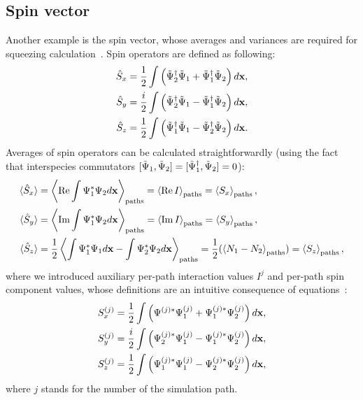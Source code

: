 \subsection{Spin vector}

Another example is the spin vector, whose averages and variances are required for squeezing calculation~\cite{Li2009}.
Spin operators are defined as following:
\begin{equation}
\label{eqn:moments-calculation:spin-operators}
\begin{split}
	\hat{S}_x & = \frac{1}{2} \int \left(
		\tilde{\Psi}^\dagger_2 \tilde{\Psi}_1 + \tilde{\Psi}^\dagger_1 \tilde{\Psi}_2
	\right) d\mathbf{x}, \\
	\hat{S}_y & = \frac{i}{2} \int \left(
		\tilde{\Psi}^\dagger_2 \tilde{\Psi}_1 - \tilde{\Psi}^\dagger_1 \tilde{\Psi}_2
	\right) d\mathbf{x}, \\
	\hat{S}_z & = \frac{1}{2} \int \left(
		\tilde{\Psi}^\dagger_1 \tilde{\Psi}_1 - \tilde{\Psi}^\dagger_2 \tilde{\Psi}_2
	\right) d\mathbf{x}.
\end{split}
\end{equation}
Averages of spin operators can be calculated straightforwardly (using the fact that interspecies commutators $[\tilde{\Psi}_1, \tilde{\Psi}_2] = [\tilde{\Psi}^\dagger_1, \tilde{\Psi}_2] = 0$):
\begin{equation*}
\begin{split}
	\langle \hat{S}_x \rangle
		& = \left\langle \operatorname{Re} \int \Psi^*_1 \Psi_2 d\mathbf{x}  \right\rangle_{\mathrm{paths}}
		= \left\langle \operatorname{Re} I \right\rangle_{\mathrm{paths}}
		= \left\langle S_x \right\rangle_{\mathrm{paths}}, \\
	\langle \hat{S}_y \rangle
		& = \left\langle \operatorname{Im} \int \Psi^*_1 \Psi_2 d\mathbf{x}  \right\rangle_{\mathrm{paths}}
		= \left\langle \operatorname{Im} I \right\rangle_{\mathrm{paths}}
		= \left\langle S_y \right\rangle_{\mathrm{paths}}, \\
	\langle \hat{S}_z \rangle
		& = \frac{1}{2} \left\langle \int \Psi^*_1 \Psi_1 d\mathbf{x} - \int \Psi^*_2 \Psi_2 d\mathbf{x} \right\rangle_{\mathrm{paths}}
		= \frac{1}{2} (\left\langle N_1 - N_2 \right\rangle_{\mathrm{paths}})
		= \left\langle S_z \right\rangle_{\mathrm{paths}},
\end{split}
\end{equation*}
where we introduced auxiliary per-path interaction values $I^{j}$ and per-path spin component values, whose definitions are an intuitive consequence of equations~:
\begin{equation*}
\begin{split}
	S^{(j)}_x & = \frac{1}{2} \int \left(
		\Psi^{(j)*} \Psi^{(j)}_1 + \Psi^{(j)*}_1 \Psi^{(j)}_2
	\right) d\mathbf{x}, \\
	S^{(j)}_y & = \frac{i}{2} \int \left(
		\Psi^{(j)*}_2 \Psi^{(j)}_1 - \Psi^{(j)*}_1 \Psi^{(j)}_2
	\right) d\mathbf{x}, \\
	S^{(j)}_z & = \frac{1}{2} \int \left(
		\Psi^{(j)*}_1 \Psi^{(j)}_1 - \Psi^{(j)*}_2 \Psi^{(j)}_2
	\right) d\mathbf{x},
\end{split}
\end{equation*}
where $j$ stands for the number of the simulation path.


